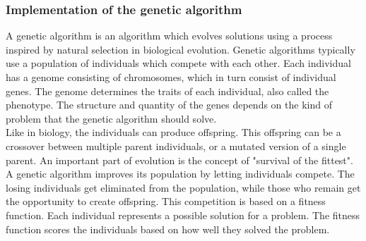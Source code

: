 
\subsubsection{Implementation of the genetic algorithm}
A genetic algorithm is an algorithm which evolves solutions using a process inspired by natural selection in biological evolution. Genetic algorithms typically use a population of individuals which compete with each other. Each individual has a genome consisting of chromosomes, which in turn consist of individual genes. The genome determines the traits of each individual, also called the phenotype. The structure and quantity of the genes depends on the kind of problem that the genetic algorithm should solve. \\
Like in biology, the individuals can produce offspring. This offspring can be a crossover between multiple parent individuals, or a mutated version of a single parent. An important part of evolution is the concept of "survival of the fittest". A genetic algorithm improves its population by letting individuals compete. The losing individuals get eliminated from the population, while those who remain get the opportunity to create offspring. This competition is based on a fitness function. Each individual represents a possible solution for a problem. The fitness function scores the individuals based on how well they solved the problem.

